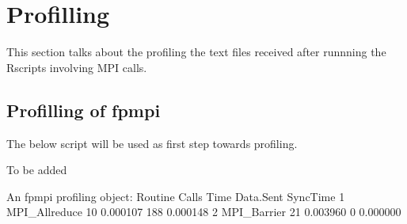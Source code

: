 \section{Profilling}
This section talks about the profiling the text files received after runnning the Rscripts 
involving MPI calls.

\subsection{Profilling of fpmpi}
The below script will be used as first step towards profiling.
\begin{Code}
To be added 
\end{Code}
\begin{Output}
An fpmpi profiling object:
        Routine Calls     Time Data.Sent SyncTime
1 MPI_Allreduce    10 0.000107       188 0.000148
2   MPI_Barrier    21 0.003960         0 0.000000

\end{Output}


